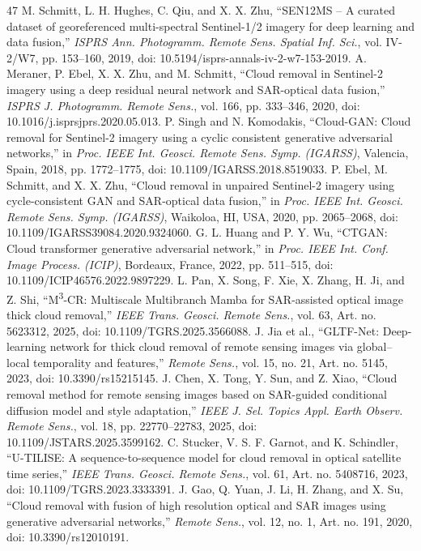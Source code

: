 \documentclass[a4paper,fleqn]{cas-dc}
\begin{document}
\begin{thebibliography}{47}
 M. Schmitt, L. H. Hughes, C. Qiu, and X. X. Zhu, ``SEN12MS -- A curated dataset of georeferenced multi-spectral Sentinel-1/2 imagery for deep learning and data fusion,'' \textit{ISPRS Ann. Photogramm. Remote Sens. Spatial Inf. Sci.}, vol. IV-2/W7, pp. 153--160, 2019, doi: 10.5194/isprs-annals-iv-2-w7-153-2019.
 A. Meraner, P. Ebel, X. X. Zhu, and M. Schmitt, ``Cloud removal in Sentinel-2 imagery using a deep residual neural network and SAR-optical data fusion,'' \textit{ISPRS J. Photogramm. Remote Sens.}, vol. 166, pp. 333--346, 2020, doi: 10.1016/j.isprsjprs.2020.05.013.
 P. Singh and N. Komodakis, ``Cloud-GAN: Cloud removal for Sentinel-2 imagery using a cyclic consistent generative adversarial networks,'' in \textit{Proc. IEEE Int. Geosci. Remote Sens. Symp. (IGARSS)}, Valencia, Spain, 2018, pp. 1772--1775, doi: 10.1109/IGARSS.2018.8519033.
 P. Ebel, M. Schmitt, and X. X. Zhu, ``Cloud removal in unpaired Sentinel-2 imagery using cycle-consistent GAN and SAR-optical data fusion,'' in \textit{Proc. IEEE Int. Geosci. Remote Sens. Symp. (IGARSS)}, Waikoloa, HI, USA, 2020, pp. 2065--2068, doi: 10.1109/IGARSS39084.2020.9324060.
 G. L. Huang and P. Y. Wu, ``CTGAN: Cloud transformer generative adversarial network,'' in \textit{Proc. IEEE Int. Conf. Image Process. (ICIP)}, Bordeaux, France, 2022, pp. 511--515, doi: 10.1109/ICIP46576.2022.9897229.
 L. Pan, X. Song, F. Xie, X. Zhang, H. Ji, and Z. Shi, ``M\textsuperscript{3}-CR: Multiscale Multibranch Mamba for SAR-assisted optical image thick cloud removal,'' \textit{IEEE Trans. Geosci. Remote Sens.}, vol. 63, Art. no. 5623312, 2025, doi: 10.1109/TGRS.2025.3566088.
 J. Jia et al., ``GLTF-Net: Deep-learning network for thick cloud removal of remote sensing images via global--local temporality and features,'' \textit{Remote Sens.}, vol. 15, no. 21, Art. no. 5145, 2023, doi: 10.3390/rs15215145.
 J. Chen, X. Tong, Y. Sun, and Z. Xiao, ``Cloud removal method for remote sensing images based on SAR-guided conditional diffusion model and style adaptation,'' \textit{IEEE J. Sel. Topics Appl. Earth Observ. Remote Sens.}, vol. 18, pp. 22770--22783, 2025, doi: 10.1109/JSTARS.2025.3599162.
 C. Stucker, V. S. F. Garnot, and K. Schindler, ``U-TILISE: A sequence-to-sequence model for cloud removal in optical satellite time series,'' \textit{IEEE Trans. Geosci. Remote Sens.}, vol. 61, Art. no. 5408716, 2023, doi: 10.1109/TGRS.2023.3333391.
 J. Gao, Q. Yuan, J. Li, H. Zhang, and X. Su, ``Cloud removal with fusion of high resolution optical and SAR images using generative adversarial networks,'' \textit{Remote Sens.}, vol. 12, no. 1, Art. no. 191, 2020, doi: 10.3390/rs12010191.

\end{thebibliography}
\end{document}
